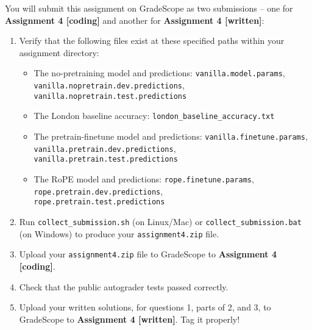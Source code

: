 \documentclass[answers]{exam}
\begin{document}
\normalsize
You will submit this assignment on GradeScope as two submissions -- one for \textbf{Assignment 4 [coding]} and another for \textbf{Assignment 4 [written]}:
\begin{enumerate}
    \item Verify that the following files exist at these specified paths within your assignment directory:
        \begin{itemize}
            \item The no-pretraining model and predictions: \texttt{vanilla.model.params}, \texttt{vanilla.nopretrain.dev.predictions},\\\texttt{vanilla.nopretrain.test.predictions}
            \item The London baseline accuracy: \texttt{london\_baseline\_accuracy.txt}
            \item The pretrain-finetune model and predictions: \texttt{vanilla.finetune.params}, \texttt{vanilla.pretrain.dev.predictions}, \\ \texttt{vanilla.pretrain.test.predictions}
            \item The RoPE model and predictions: \texttt{rope.finetune.params}, \texttt{rope.pretrain.dev.predictions}, \\ \texttt{rope.pretrain.test.predictions}
        \end{itemize}

    \item Run \texttt{collect\_submission.sh} (on Linux/Mac) or \texttt{collect\_submission.bat} (on Windows) to produce your \texttt{assignment4.zip} file.
    \item Upload your \texttt{assignment4.zip} file to GradeScope to \textbf{Assignment 4 [coding]}.
    \item Check that the public autograder tests passed correctly.
    \item Upload your written solutions, for questions 1, parts of 2, and 3, to GradeScope to \textbf{Assignment 4 [written]}. Tag it properly!
\end{enumerate}



\end{document}
